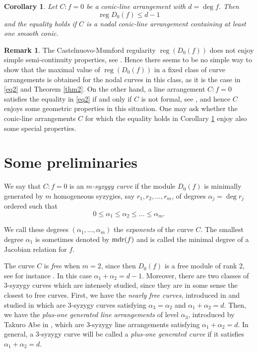 \documentclass[12pt]{amsart}
\theoremstyle{plain}
\newtheorem{cor}[subsection]{Corollary}
\theoremstyle{definition}
\newtheorem{rk}[subsection]{Remark}
\numberwithin{equation}{section}
\newcommand{\al}{{\alpha}}
\DeclareMathOperator{\reg}{reg}
\begin{document}
\begin{cor}
\label{corT2}
Let $C:f=0$ be a conic-line arrangement with $d=\deg f$. Then
$$\reg D_0(f) \leq d-1$$
and the equality holds if $C$ is a  nodal conic-line arrangement containing at least one smooth conic.
\end{cor}

\begin{rk}
\label{rkI}
The Castelnuovo-Mumford regularity $\reg(D_0(f))$ does not enjoy simple semi-continuity properties, see \cite[Remark 5.3]{DIM}. Hence there seems to be  no simple way to show that the maximal value of 
$\reg(D_0(f))$ in a fixed class of curve arrangements is obtained for the nodal curves in this class, as it is the case in \eqref{eq2} and Theorem \ref{thm2}. On the other hand, a line arrangement $C:f=0$ satisfies the equality in \eqref{eq2} if and only if $C$ is not formal, see \cite[Corollary 7.8]{DST}, and hence $C$ enjoys some geometric properties in this situation. One may ask
whether the conic-line arrangements $C$ for which the equality holds in Corollary \ref{corT2} enjoy also some special properties.
\end{rk}



\section{Some preliminaries } 

We say that $C:f=0$ is an {\it $m$-syzygy curve} if  the module $D_0(f)$ is minimally generated by $m$ homogeneous syzygies, say $r_1,r_2,...,r_m$, of degrees $\al_j=\deg r_j$ ordered such that 
\begin{equation}
\label{eq0}
0 \leq \al_1\leq \al_2 \leq ...\leq \al_m.
\end{equation}

We call these degrees $(\al_1, \ldots, \al_m)$ the {\it exponents} of the curve $C$. 
The smallest degree $\al_1$ is sometimes denoted by ${\rm mdr}(f)$ and is called the minimal degree of a Jacobian relation for $f$. 

The curve $C$ is {\it free} when $m=2$, since then  $D_0(f)$ is a free module of rank 2, see for instance \cite{B+,Dmax,DStRIMS,ST}. In this case
$\al_1+\al_2=d-1$.
Moreover, there are two classes of 3-syzygy curves which are intensely studied, since they are in some sense the closest to free curves.
First, we have the  {\it nearly free curves}, introduced in \cite{DStRIMS} and studied in \cite{AD, B+, Dmax,  MaVa} which are 3-syzygy curves satisfying $\al_3=\al_2$ and $\al_1+\al_2=d$. 
Then, we have the  {\it plus-one generated line arrangements} of level $\al_3$, introduced by Takuro Abe in \cite{Abe},
which are 3-syzygy line arrangements satisfying $\al_1+\al_2=d$. In general, a  3-syzygy curve will be called a {\it plus-one generated curve}  if it satisfies $\al_1+\al_2=d$. 
\end{document}
